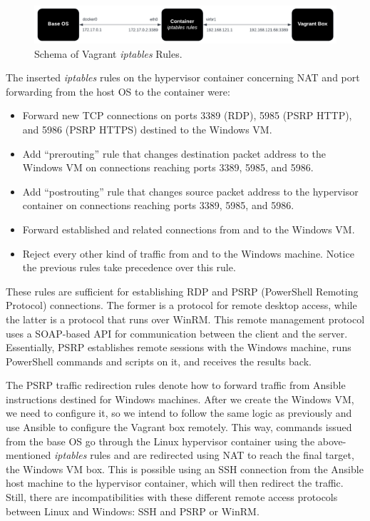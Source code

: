 \begin{figure}[H]
    \includegraphics[width=13cm]{figures/vagrant_iptables_rules.pdf}
    \caption{Schema of Vagrant \textit{iptables} Rules.}
    \label{fig:vagrant_iptables_rules}
\end{figure}

The inserted \textit{iptables} rules on the hypervisor container concerning NAT and port forwarding from the host OS to the container were:

\begin{itemize}
    \item Forward new TCP connections on ports 3389 (RDP), 5985 (PSRP HTTP), and 5986 (PSRP HTTPS) destined to the Windows VM.
    \item Add ``prerouting'' rule that changes destination packet address to the Windows VM on connections reaching ports 3389, 5985, and 5986.
    \item Add ``postrouting'' rule that changes source packet address to the hypervisor container on connections reaching ports 3389, 5985, and 5986.
    \item Forward established and related connections from and to the Windows VM.
    \item Reject every other kind of traffic from and to the Windows machine. Notice the previous rules take precedence over this rule.
\end{itemize}

These rules are sufficient for establishing RDP and PSRP (PowerShell Remoting Protocol) connections. The former is a protocol for remote desktop access, while the latter is a protocol that runs over WinRM. This remote management protocol uses a SOAP-based API for communication between the client and the server. Essentially, PSRP establishes remote sessions with the Windows machine, runs PowerShell commands and scripts on it, and receives the results back.


The PSRP traffic redirection rules denote how to forward traffic from Ansible instructions destined for Windows machines. After we create the Windows VM, we need to configure it, so we intend to follow the same logic as previously and use Ansible to configure the Vagrant box remotely. This way, commands issued from the base OS go through the Linux hypervisor container using the above-mentioned \textit{iptables} rules and are redirected using NAT to reach the final target, the Windows VM box. This is possible using an SSH connection from the Ansible host machine to the hypervisor container, which will then redirect the traffic. Still, there are incompatibilities with these different remote access protocols between Linux and Windows: SSH and PSRP or WinRM. 


